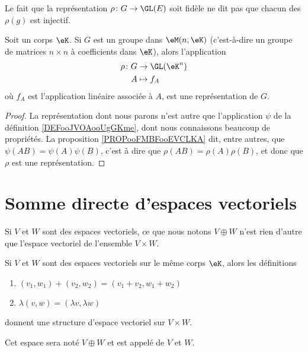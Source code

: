 Le fait que la représentation \( \rho\colon G \to \GL(E)\) soit fidèle ne dit pas que chacun des \( \rho(g)\) est injectif.

\begin{proposition}     \label{PROPooHNQOooSzeEFG}
	Soit un corps \( \eK\). Si \( G\) est un groupe dans \( \eM(n,\eK)\) (c'est-à-dire un groupe de matrices \( n\times n\) à coefficients dans \( \eK\)), alors l'application
	\begin{equation}
		\begin{aligned}
			\rho\colon G & \to \GL(\eK^n) \\
			A            & \mapsto f_A
		\end{aligned}
	\end{equation}
	où \( f_A\) est l'application linéaire associée à \( A\), est une représentation de \( G\).
\end{proposition}

\begin{proof}
    La représentation dont nous parons n'est autre que l'application \( \psi\) de la définition \ref{DEFooJVOAooUgGKme}, dont nous connaissons beaucoup de propriétés. La proposition \ref{PROPooFMBFooEVCLKA} dit, entre autres, que \( \psi(AB)=\psi(A)\psi(B)\), c'est à dire que \( \rho(AB)=\rho(A)\rho(B)\), et donc que \( \rho\) est une représentation.
\end{proof}


\section{Somme directe d'espaces vectoriels}

Si \( V\) et \( W\) sont des espaces vectoriels, ce que nous notons \( V\oplus W\) n'est rien d'autre que l'espace vectoriel de l'ensemble \( V\times W\).

\begin{propositionDef}                      \label{DEFooJKAWooKkkkwm}
	Si \( V\) et \( W\) sont des espaces vectoriels sur le même corps \( \eK\), alors les définitions
	\begin{enumerate}
		\item
		      \( (v_1,w_1)+(v_2,w_2)=(v_1+v_2,w_1+w_2)\)
		\item
		      \( \lambda(v,w)=(\lambda v,\lambda w)\)
	\end{enumerate}
	donnent une structure d'espace vectoriel sur \( V\times W\).

	Cet espace sera noté \( V\oplus W\) et est appelé  de \( V\) et \( W\).
\end{propositionDef}

